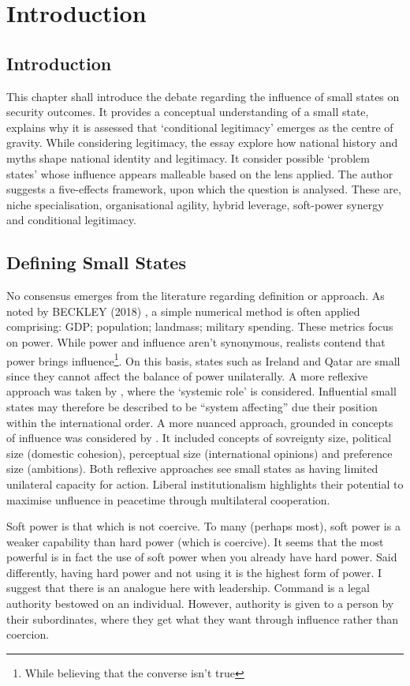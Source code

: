 
\chapter{Introduction}

\section*{Introduction}
This chapter shall introduce the debate regarding the influence of small states on security outcomes. It provides a conceptual understanding of a small state, explains why it is assessed that `conditional legitimacy' emerges as the centre of gravity. While considering legitimacy, the essay explore how national history and myths shape national identity and legitimacy. It consider possible `problem states' whose influence appears malleable based on the lens applied. The author suggests a five-effects framework, upon which the question is analysed. These are, niche specialisation, organisational agility, hybrid leverage, soft-power synergy and conditional legitimacy. 


\section*{Defining Small States}
No consensus emerges from the literature regarding definition or approach. As noted by BECKLEY (2018) \nocite{BECKLEY_2018}, a simple numerical method is often applied comprising: GDP; population; landmass; military spending. These metrics focus on power. While power and influence aren't synonymous, realists contend that power brings influence\footnote{While believing that the converse isn't true}. On this basis, states such as Ireland  and Qatar are small since they cannot affect the balance of power unilaterally. A more reflexive approach was taken by \textcite{KEOHANE_1969}, where the `systemic role' is considered. Influential small states may therefore be described to be ``system affecting'' due their position within the international order. A more nuanced approach, grounded in concepts of influence was considered by \textcite{THORHALLSSON_2006}. It included concepts of sovreignty size, political size (domestic cohesion), perceptual size (international opinions) and preference size (ambitions). Both reflexive approaches see small states as having limited unilateral capacity for action. Liberal institutionalism highlights their potential to maximise unfluence in peacetime through multilateral cooperation.


Soft power is that which is not coercive. To many (perhaps most), soft power is a weaker capability than hard power (which is coercive). It seems that the most powerful is in fact the use of soft power when you already have hard power. Said differently, having hard power and not using it is the highest form of power. I suggest that there is an analogue here with leadership. Command is a legal authority bestowed on an individual. However, authority is given to a person by their subordinates, where they get what they want through influence rather than coercion. 

